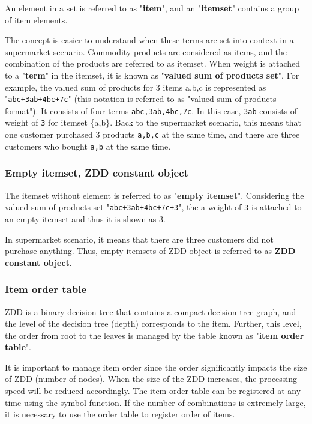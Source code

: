 An element in a set is referred to as "{\bf item}", and an "{\bf itemset}" contains a group of item elements.

The concept is easier to understand when these terms are set into context in a supermarket scenario. Commodity products are considered as items, and the combination of the products are referred to as itemset. When weight is attached to a "{\bf term}" in the itemset, it is known as "{\bf valued sum of products set}".
For example, the valued sum of products for 3 items a,b,c is represented as "\verb|abc+3ab+4bc+7c|" (this notation is referred to as "valued sum of products format"). It consists of four terms \verb|abc,3ab,4bc,7c|. In this case, \verb|3ab| consists of weight of \verb|3| for itemset \{a,b\}. Back to the supermarket scenario, this means that one customer purchased 3 products \verb|a,b,c| at the same time, and there are three customers who bought \verb|a,b| at the same time.

\subsubsection*{Empty itemset, ZDD constant object}
The itemset without element is referred to as "{\bf empty itemset}". Considering the valued sum of products set "\verb|abc+3ab+4bc+7c+3|", the a weight of \verb|3|  is attached to an empty itemset and thus it is shown as 3.

In supermarket scenario, it means that there are three customers did not purchase anything. 
Thus, empty itemsets of ZDD object is referred to as {\bf ZDD constant object}.

\subsubsection*{Item order table}
ZDD is a binary decision tree that contains a compact decision tree graph, and the level of the decision tree (depth) corresponds to the item. Further, this level, the order from  root to the leaves is managed by the table known as "{\bf item order table}".

It is important to manage item order since the order significantly impacts the size of ZDD (number of nodes). When the size of the ZDD increases, the processing speed will be reduced accordingly.
The item order table can be registered at any time using the \hyperref[sect:symbol]{symbol} function. If the number of combinations is extremely large, it is necessary to use the order table to register order of items.

